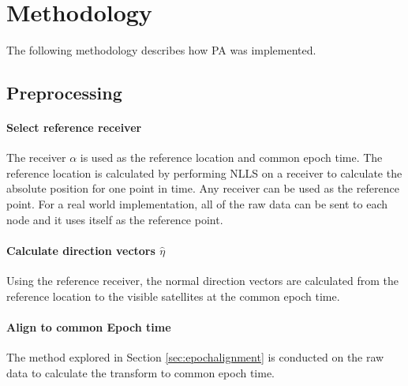\section{Methodology}
The following methodology describes how PA was implemented. 


\subsection{Preprocessing }

\paragraph{Select reference receiver}
The receiver $\alpha$ is used as the reference location and common epoch time. The reference location is calculated by performing NLLS on a receiver to calculate the absolute position for one point in time. Any receiver can be used as the reference point. For a real world implementation, all of the raw data can be sent to each node and it uses itself as the reference point.

\paragraph{Calculate direction vectors $\hat{\eta}$}
Using the reference receiver, the normal direction vectors are calculated from the reference location to the visible satellites at the common epoch time.

\paragraph{Align to common Epoch time}\label{timetransform}
The method explored in Section \ref{sec:epochalignment} is conducted on the raw data to calculate the transform to common epoch time.


